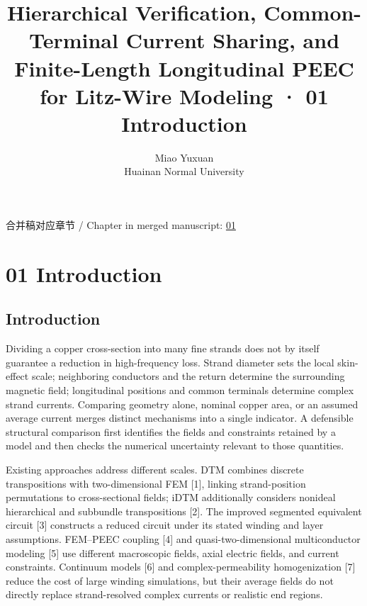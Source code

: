 \documentclass[11pt]{article}
\begin{document}
\title{Hierarchical Verification, Common-Terminal Current Sharing, and Finite-Length Longitudinal PEEC for Litz-Wire Modeling · 01 Introduction}
\author{Miao Yuxuan\\Huainan Normal University}
\date{}
\maketitle
\noindent 合并稿对应章节 / Chapter in merged manuscript: \href{paper_en_single.pdf#chapter-01}{01}\par
\FloatBarrier
\section*{01 Introduction}
\hypertarget{chapter-01}{}
\subsection*{Introduction}
\hypertarget{01.introduction.heading}{}
Dividing a copper cross-section into many fine strands does not by itself guarantee a reduction in high-frequency loss. Strand diameter sets the local skin-effect scale; neighboring conductors and the return determine the surrounding magnetic field; longitudinal positions and common terminals determine complex strand currents. Comparing geometry alone, nominal copper area, or an assumed average current merges distinct mechanisms into a single indicator. A defensible structural comparison first identifies the fields and constraints retained by a model and then checks the numerical uncertainty relevant to those quantities.


Existing approaches address different scales. DTM combines discrete transpositions with two-dimensional FEM [1], linking strand-position permutations to cross-sectional fields; iDTM additionally considers nonideal hierarchical and subbundle transpositions [2]. The improved segmented equivalent circuit [3] constructs a reduced circuit under its stated winding and layer assumptions. FEM–PEEC coupling [4] and quasi-two-dimensional multiconductor modeling [5] use different macroscopic fields, axial electric fields, and current constraints. Continuum models [6] and complex-permeability homogenization [7] reduce the cost of large winding simulations, but their average fields do not directly replace strand-resolved complex currents or realistic end regions.
\end{document}
